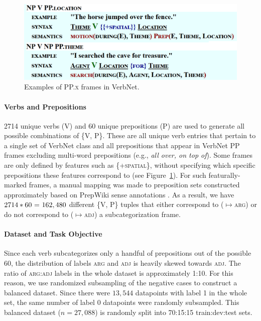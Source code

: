 \documentclass[letterpaper]{article} %
\begin{document}
\begin{figure}[h]
\centering
	\includegraphics[width=0.9\linewidth]{ppframes}
	\caption{Examples of \textsc{PP.x} frames in VerbNet.}
	\label{fig:ppframes}
\end{figure}

\paragraph{Verbs and Prepositions} 2714 unique verbs (V) and 60 unique prepositions (P) are used to generate all possible combinations of \{\textsc{V, P}\}. These are all unique verb entries that pertain to a single set of VerbNet class and all prepositions that appear in VerbNet PP frames excluding multi-word prepositions (e.g., \textit{all over, on top of}). Some frames are only defined by features such as \textsc{\{+spatial\}}, without specifying which specific prepositions these features correspond to (see Figure~\ref{fig:ppframes}). For such featurally-marked frames, a manual mapping was made to preposition sets constructed approximately based on PrepWiki sense annotations \cite{schneider2015hierarchy}. As a result, we have $2714*60\textnormal{ = }162,480$ different \textsc{\{V, P\}} tuples that either correspond to ($\mapsto$\textsc{arg}) or do not correspond to ($\mapsto$\textsc{adj}) a subcategorization frame.

\paragraph{Dataset and Task Objective}  Since each verb subcategorizes only a handful of prepositions out of the possible 60, the distribution of labels \textsc{arg} and \textsc{adj} is heavily skewed towards \textsc{adj}. The ratio of \textsc{arg}:\textsc{adj} labels in the whole dataset is approximately 1:10. For this reason, we use randomized subsampling of the negative cases to construct a balanced dataset. Since there were $13,544$ datapoints with label 1 in the whole set, the same number of label 0 datapoints were randomly subsampled. This balanced dataset ($n=27,088$) is randomly split into 70:15:15 train:dev:test sets.
\end{document}
